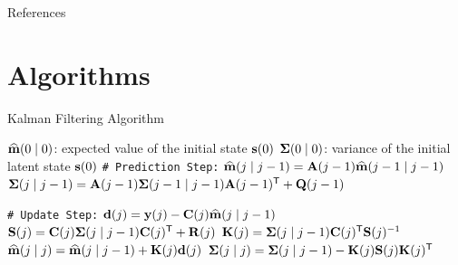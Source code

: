 \documentclass[dvipsnames, 11pt]{beamer}
\begin{document}
\begin{frame}[allowframebreaks]{References}
    \footnotesize
    \nocite{Sarkka-GP-KF-2013,Bayesian-Filter-Book-2023}
    
\end{frame}

\appendix


\section{Algorithms}

\begin{frame}{Kalman Filtering Algorithm \citep{Kalman-Filter-1960}}
    \footnotesize
    \begin{algorithmic}[1]
        \Require
            \Statex \hspace{\algorithmicindent} $\widehat{\mathbf{m}}(0 \mid 0)$: expected value of the initial state $\mathbf{s}(0)$       
            \Statex \hspace{\algorithmicindent} $\bm{\Sigma}(0 \mid 0)$: variance of the initial latent state $\mathbf{s}(0)$
            \Statex \texttt{\# Prediction Step:}
            \State $\widehat{\mathbf{m}}(j \mid j-1) = \mathbf{A}(j-1)\widehat{\mathbf{m}}(j-1 \mid j-1)$
            \State $\bm{\Sigma}(j \mid j-1) = \mathbf{A}(j-1)\bm{\Sigma}(j-1 \mid j-1)\mathbf{A}(j-1)^{\scriptstyle{\mathsf{T}}} + \mathbf{Q}(j-1)$

            \Statex \texttt{\# Update Step:}
            \State $\mathbf{d}(j) = \mathbf{y}(j) - \mathbf{C}(j)\widehat{\mathbf{m}}(j \mid j-1)$
            \State $\mathbf{S}(j) = \mathbf{C}(j)\bm{\Sigma}(j \mid j-1)\mathbf{C}(j)^{\scriptstyle{\mathsf{T}}} + \mathbf{R}(j)$
            \State $\mathbf{K}(j) = \bm{\Sigma}(j \mid j-1)\mathbf{C}(j)^{\scriptstyle{\mathsf{T}}}\mathbf{S}(j)^{-1}$ %
            \State $\widehat{\mathbf{m}}(j \mid j) = \widehat{\mathbf{m}}(j \mid j-1) + \mathbf{K}(j)\mathbf{d}(j)$
            \State $\bm{\Sigma}(j \mid j) = \bm{\Sigma}(j \mid j-1) - \mathbf{K}(j)\mathbf{S}(j)\mathbf{K}(j)^{\scriptstyle{\mathsf{T}}}$
        \EndFor
    \end{algorithmic}
\end{frame}
\end{document}
